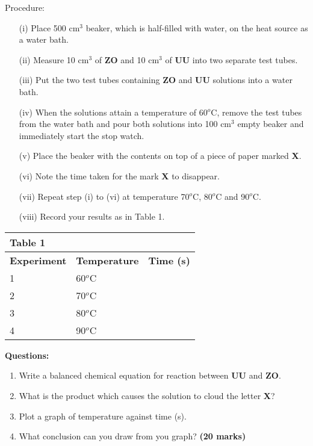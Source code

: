 Procedure:\\
\begin{enumerate}
\item[(i)] Place 500 cm$^3$ beaker, which is half-filled with water, on the heat source as a water bath.
\item[(ii)] Measure 10 cm$^3$ of \textbf{ZO} and 10 cm$^3$ of \textbf{UU} into two separate test tubes.
\item[(iii)] Put the two test tubes containing \textbf{ZO} and \textbf{UU} solutions into a water bath.
\item[(iv)] When the solutions attain a temperature of 60$^o$C, remove the test tubes from the water bath and pour both solutions into 100 cm$^3$ empty beaker and immediately start the stop watch.
\item[(v)] Place the beaker with the contents on top of a piece of paper marked \textbf{X}.
\item[(vi)] Note the time taken for the mark \textbf{X} to disappear.
\item[(vii)] Repeat step (i) to (vi) at temperature 70$^o$C, 80$^o$C and 90$^o$C.
\item[(viii)] Record your results as in Table 1.
\end{enumerate}

\begin{center}
\begin{tabular}{|p{5cm}|p{5cm}|p{3cm}|}
\multicolumn{1}{l}{Table 1}&\multicolumn{1}{l}{ }&\multicolumn{1}{l}{ }\\ \hline
\textbf{Experiment}&\textbf{Temperature}&\textbf{Time (s)}\\ \hline
1&60$^o$C&\\ \hline
2&70$^o$C&\\ \hline
3&80$^o$C&\\ \hline
4&90$^o$C&\\ \hline
\end{tabular}
\end{center}

\textbf{Questions:}\\
\begin{enumerate}
\item Write a balanced chemical equation for reaction between \textbf{UU} and \textbf{ZO}.
\item What is the product which causes the solution to cloud the letter \textbf{X}?
\item Plot a graph of temperature against time (s).
\item What conclusion can you draw from you graph? \hfill \textbf{(20 marks)} \\
\end{enumerate}


